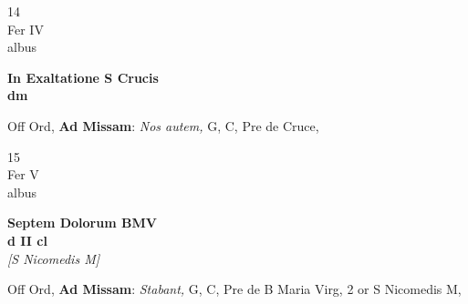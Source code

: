 \documentclass[10pt, openany]{book}
\begin{document}
        \begin{center}
            \begin{minipage}{3.5in}
                \vspace{2em}
                \begin{minipage}{0.5in}
                    {\Huge 14} \\
                    {\normalsize Fer IV} \\
                    {\normalsize albus}
                \end{minipage}
                \begin{minipage}{3.0in}
                    \textbf{ \large In Exaltatione S Crucis \\
                    \textnormal{\normalsize dm}} \\ 
                \end{minipage}
                \begin{justify}Off Ord, \textbf{Ad Missam}: \textit{Nos autem,} G, C, Pre de Cruce,   
                \end{justify}
            \end{minipage}
        \end{center}
    
        \begin{center}
            \begin{minipage}{3.5in}
                \vspace{2em}
                \begin{minipage}{0.5in}
                    {\Huge 15} \\
                    {\normalsize Fer V} \\
                    {\normalsize albus}
                \end{minipage}
                \begin{minipage}{3.0in}
                    \textbf{ \large Septem Dolorum BMV \\
                    \textnormal{\normalsize d II cl}} \\ \textit{[S Nicomedis M]} \\ 
                \end{minipage}
                \begin{justify}Off Ord, \textbf{Ad Missam}: \textit{Stabant,} G, C, Pre de B Maria Virg, 2 or S Nicomedis M,   
                \end{justify}
            \end{minipage}
        \end{center}
    
\end{document}
